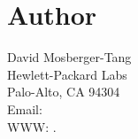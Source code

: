 \documentclass{article}
\begin{document}
\section{Author}

\noindent
David Mosberger-Tang\\
Hewlett-Packard Labs\\
Palo-Alto, CA 94304\\
Email: \\
WWW: .
\LatexManEnd
\end{document}
